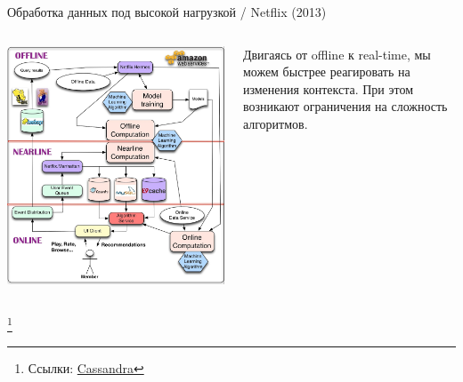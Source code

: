 \documentclass[11pt,aspectratio=169,handout]{beamer}
\begin{document}
\begin{frame}{Обработка данных под высокой нагрузкой / Netflix (2013) \cite{NFLX}}

\begin{columns}
\begin{column}{0.6\textwidth}
   \begin{center}
		\includegraphics[scale=0.1]{images/netflix.png}
   \end{center}
\end{column}
\begin{column}{0.35\textwidth}
    \begin{small}
    \begin{tcolorbox}[colback=info!5,colframe=info!80,title=]
    Двигаясь от offline к real-time, мы можем быстрее реагировать на изменения контекста. При этом возникают ограничения на сложность алгоритмов.
    \end{tcolorbox}
    \end{small}
\end{column}
\end{columns}

\footnote{Ссылки:
\href{https://cassandra.apache.org/_/index.html}{Cassandra}
}


\end{frame}
\end{document}
